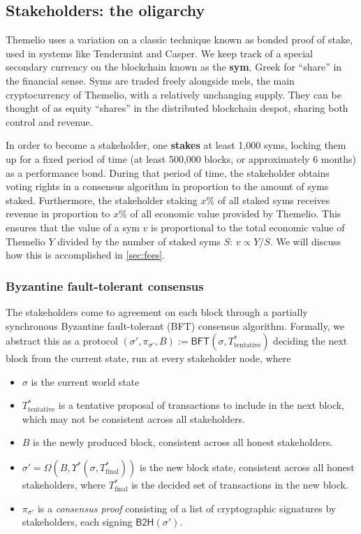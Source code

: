 \documentclass[letterpaper,12pt,oneside]{article}
\begin{document}
\subsection{Stakeholders: the oligarchy}

Themelio uses a variation on a classic technique known as bonded proof of stake, used in systems like Tendermint and Casper. We keep track of a special secondary currency on the blockchain known as the \textbf{sym}, Greek for ``share'' in the financial sense. Syms are traded freely alongside mels, the main cryptocurrency of Themelio, with a relatively unchanging supply. They can be thought of as equity ``shares'' in the distributed blockchain despot, sharing both control and revenue.

In order to become a stakeholder, one \textbf{stakes} at least 1,000 syms, locking them up for a fixed period of time (at least 500,000 blocks, or approximately 6 months) as a performance bond. During that period of time, the stakeholder obtains voting rights in a  consensus algorithm in proportion to the amount of syms staked. Furthermore, the stakeholder staking $x$\% of all staked syms receives revenue in proportion to $x$\% of all economic value provided by Themelio. This ensures that the value of a sym $v$ is proportional to the total economic value of Themelio $Y$ divided by the number of staked syms $S$: $v \propto Y/S$. We will discuss how this is accomplished in \ref{sec:fees}.

\subsubsection{Byzantine fault-tolerant consensus}

The stakeholders come to agreement on each block through a partially synchronous Byzantine fault-tolerant (BFT) consensus algorithm. Formally, we abstract this as a protocol $(\sigma', \pi_{\sigma'}, B) := \mathsf{BFT}(\sigma, T^*_\mathrm{tentative})$ deciding the next block from the current state, run at every stakeholder node, where
\begin{itemize}
    \item $\sigma$ is the current world state
    \item $T^{*}_\mathrm{tentative}$ is a tentative proposal of transactions to include in the next block, which may not be consistent across all stakeholders.
    \item $B$ is the newly produced block, consistent across all honest stakeholders.
    \item $\sigma'=\Omega(B, \Upsilon^*(\sigma, T^*_{\mathrm{final}}))$ is the new block state, consistent across all honest stakeholders, where $T^*_{\mathrm{final}}$ is the decided set of transactions in the new block.
    \item $\pi_{\sigma'}$ is a \emph{consensus proof} consisting of a list of cryptographic signatures by stakeholders, each signing $\mathsf{B2H}(\sigma')$.
\end{itemize}
\end{document}
